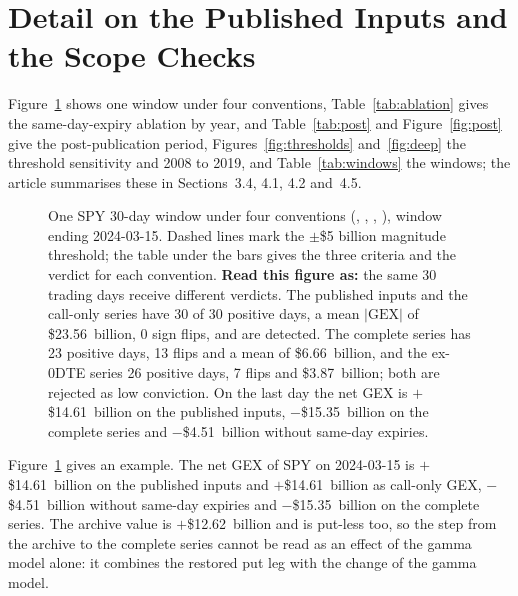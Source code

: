 \section{Detail on the Published Inputs and the Scope Checks}
\label{sup:detail}

Figure~\ref{fig:window} shows one window under four conventions, Table~\ref{tab:ablation} gives the same-day-expiry ablation by year, and Table~\ref{tab:post} and Figure~\ref{fig:post} give the post-publication period, Figures~\ref{fig:thresholds} and~\ref{fig:deep} the threshold sensitivity and 2008 to 2019, and Table~\ref{tab:windows} the windows; the article summarises these in Sections~3.4, 4.1, 4.2 and~4.5.

\begin{figure}[H]
\centering
\resultfigure{\figWindow}
\caption{One SPY 30-day window under four conventions (, , , ), window ending 2024-03-15. Dashed lines mark the $\pm$\$5 billion magnitude threshold; the table under the bars gives the three criteria and the verdict for each convention. \textbf{Read this figure as:} the same 30 trading days receive different verdicts. The published inputs and the call-only series have 30 of 30 positive days, a mean $|\mathrm{GEX}|$ of \$23.56~billion, 0 sign flips, and are detected. The complete series has 23 positive days, 13 flips and a mean of \$6.66~billion, and the ex-0DTE series 26 positive days, 7 flips and \$3.87~billion; both are rejected as low conviction. On the last day the net GEX is $+$\$14.61~billion on the published inputs, $-$\$15.35~billion on the complete series and $-$\$4.51~billion without same-day expiries.}
\label{fig:window}
\end{figure}

Figure~\ref{fig:window} gives an example. The net GEX of SPY on 2024-03-15 is $+$\$14.61~billion on the published inputs and $+$\$14.61~billion as call-only GEX, $-$\$4.51~billion without same-day expiries and $-$\$15.35~billion on the complete series. The archive value is $+$\$12.62~billion and is put-less too, so the step from the archive to the complete series cannot be read as an effect of the gamma model alone: it combines the restored put leg with the change of the gamma model.

